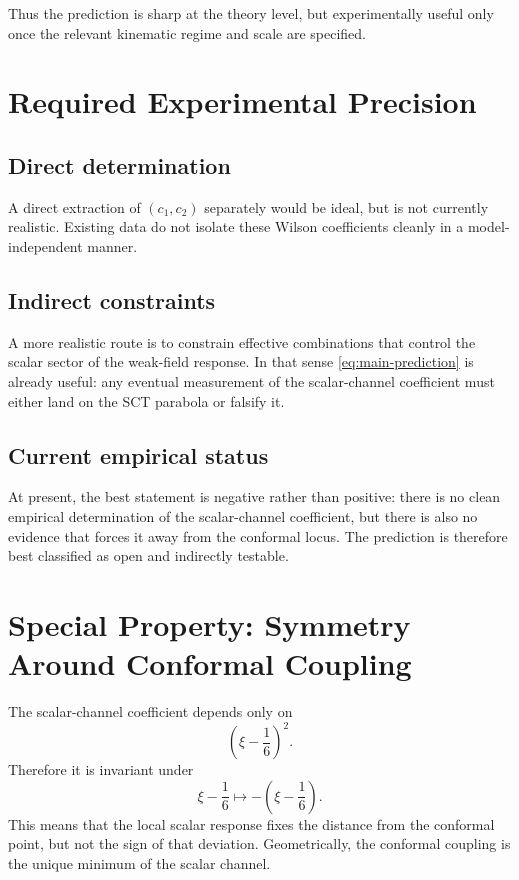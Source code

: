 \documentclass[11pt,a4paper]{article}
\begin{document}
Thus the prediction is sharp at the theory level, but experimentally useful
only once the relevant kinematic regime and scale are specified.

\section{Required Experimental Precision}
\label{sec:precision}

\subsection{Direct determination}

A direct extraction of $(c_1,c_2)$ separately would be ideal, but is not
currently realistic.  Existing data do not isolate these Wilson coefficients
cleanly in a model-independent manner.

\subsection{Indirect constraints}

A more realistic route is to constrain effective combinations that control
the scalar sector of the weak-field response.  In that sense
\eqref{eq:main-prediction} is already useful: any eventual measurement of the
scalar-channel coefficient must either land on the SCT parabola or falsify
it.

\subsection{Current empirical status}

At present, the best statement is negative rather than positive: there is no
clean empirical determination of the scalar-channel coefficient, but there is
also no evidence that forces it away from the conformal locus.  The
prediction is therefore best classified as open and indirectly testable.

\section{Special Property: Symmetry Around Conformal Coupling}
\label{sec:special}

The scalar-channel coefficient depends only on
\begin{equation}
  \left(\xi - \frac{1}{6}\right)^2.
  \label{eq:symmetric-square}
\end{equation}
Therefore it is invariant under
\begin{equation}
  \xi - \frac{1}{6}
  \longmapsto
  -\left(\xi - \frac{1}{6}\right).
  \label{eq:reflection}
\end{equation}
This means that the local scalar response fixes the distance from the
conformal point, but not the sign of that deviation.  Geometrically, the
conformal coupling is the unique minimum of the scalar channel.
\end{document}
